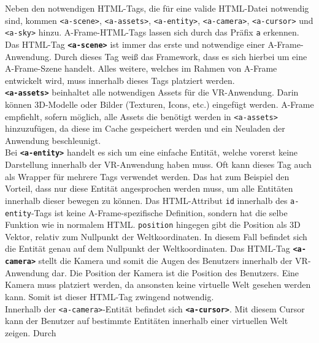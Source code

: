 \documentclass[a4paper,12pt,oneside]{article}
\begin{document}
        Neben den notwendigen HTML-Tags, die für eine valide HTML-Datei
        notwendig sind, kommen \texttt{<a-scene>}, \texttt{<a-assets>},
        \texttt{<a-entity>}, \texttt{<a-camera>}, \texttt{<a-cursor>}
        und \texttt{<a-sky>} hinzu. A-Frame-HTML-Tags lassen sich durch
        das Präfix \texttt{a} erkennen. \\
        Das HTML-Tag \texttt{\textbf{<a-scene>}} ist immer das erste und notwendige
        einer A-Frame-Anwendung. Durch dieses Tag weiß das Framework, 
        dass es sich hierbei um eine A-Frame-Szene handelt. Alles weitere,
        welches im Rahmen von A-Frame entwickelt wird, muss innerhalb
        dieses Tags platziert werden. \\
        \texttt{\textbf{<a-assets>}} beinhaltet alle notwendigen Assets für die 
        VR-Anwendung. Darin können 3D-Modelle oder 
        Bilder (Texturen, Icons, etc.) eingefügt werden. A-Frame empfiehlt,
        sofern möglich, alle Assets die benötigt werden in \texttt{<a-assets>}
        hinzuzufügen, da diese im Cache gespeichert werden und ein Neuladen
        der Anwendung beschleunigt. \\
        Bei \texttt{\textbf{<a-entity>}} handelt es sich um eine einfache Entität,
        welche vorerst keine Darstellung innerhalb der VR-Anwendung haben
        muss. Oft kann dieses Tag auch als Wrapper für mehrere Tags verwendet
        werden. Das hat zum Beispiel den Vorteil, dass nur diese Entität
        angesprochen werden muss, um alle Entitäten innerhalb dieser bewegen
        zu können. Das HTML-Attribut \texttt{id} innerhalb des 
        \texttt{a-entity}-Tags ist keine A-Frame-spezifische Definition,
        sondern hat die selbe Funktion wie in normalem HTML.
        \texttt{position} hingegen gibt die Position als 3D Vektor, 
        relativ zum Nullpunkt der Weltkoordinaten. In diesem Fall befindet
        sich die Entität genau auf dem Nullpunkt der Weltkoordinaten.
        Das HTML-Tag \texttt{\textbf{<a-camera>}} stellt die Kamera und
        somit die Augen des Benutzers innerhalb der VR-Anwendung dar. Die
        Position der Kamera ist die Position des Benutzers. Eine Kamera
        muss platziert werden, da ansonsten keine virtuelle Welt gesehen
        werden kann. Somit ist dieser HTML-Tag zwingend notwendig. \\
        Innerhalb der \texttt{<a-camera>}-Entität befindet sich 
        \texttt{\textbf{<a-cursor>}}. Mit diesem Cursor kann der Benutzer
        auf bestimmte Entitäten innerhalb einer virtuellen Welt zeigen. Durch
\end{document}
